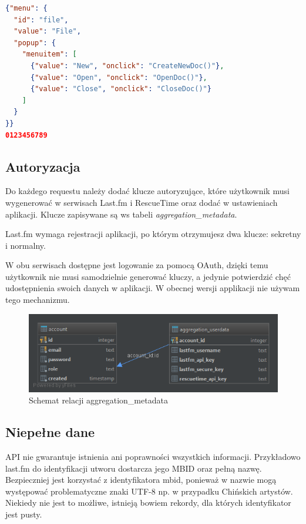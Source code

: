 \documentclass[brudnopis]{xmgr}
\begin{document}
            \begin{lstlisting}[language=json,firstnumber=1]
{"menu": {
  "id": "file",
  "value": "File",
  "popup": {
    "menuitem": [
      {"value": "New", "onclick": "CreateNewDoc()"},
      {"value": "Open", "onclick": "OpenDoc()"},
      {"value": "Close", "onclick": "CloseDoc()"}
    ]
  }
}}
0123456789
            \end{lstlisting}


        \subsection*{Autoryzacja}
        
        Do każdego requestu należy dodać klucze autoryzujące, które użytkownik musi wygenerować w serwisach Last.fm i RescueTime \cite{rescuetime:apidoc-keymanagment} oraz dodać w ustawieniach aplikacji. Klucze zapisywane są ws tabeli \textit{aggregation\_metadata}.
        
        Last.fm wymaga rejestracji aplikacji, po którym otrzymujesz dwa klucze: sekretny i normalny.
        
        W obu serwisach dostępne jest logowanie za pomocą OAuth, dzięki temu użytkownik nie musi samodzielnie generować kluczy, 
        a jedynie potwierdzić chęć udostępnienia swoich danych w aplikacji. W obecnej wersji applikacji nie używam tego mechanizmu.
        
        \begin{figure}
        	\includegraphics[width=\linewidth]{fig/db-aggregation-metadata.png}
        	\caption{Schemat relacji aggregation\_metadata}
        	\label{fig:}
        \end{figure}

        \subsection*{Niepełne dane}
        API nie gwarantuje istnienia ani poprawności wszystkich informacji.
        Przykładowo last.fm do identyfikacji utworu dostarcza jego MBID oraz pełną nazwę.
        Bezpieczniej jest korzystać z identyfikatora mbid, ponieważ w nazwie mogą występować problematyczne znaki UTF-8 np. w przypadku Chińskich artystów.
        Niekiedy nie jest to możliwe, istnieją bowiem rekordy, dla których identyfikator jest pusty.
\end{document}
